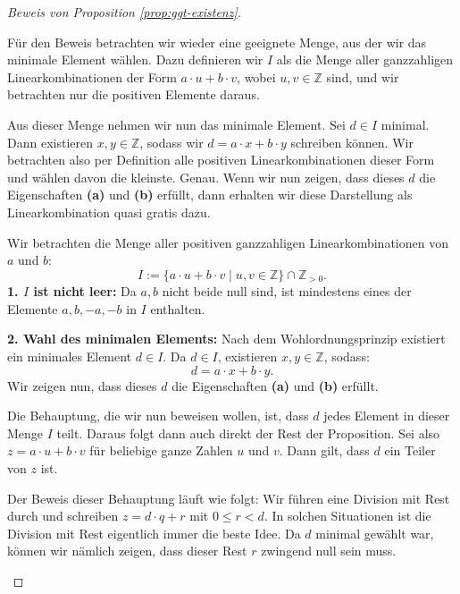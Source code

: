\begin{proof}[Beweis von Proposition \ref{prop:ggt-existenz}]
\begin{spoken-clean}[00:17:50 - 00:20:15]
Für den Beweis betrachten wir wieder eine geeignete Menge, aus der wir das minimale Element wählen. Dazu definieren wir $I$ als die Menge aller ganzzahligen Linearkombinationen der Form $a \cdot u + b \cdot v$, wobei $u, v \in \mathbb{Z}$ sind, und wir betrachten nur die positiven Elemente daraus.

Aus dieser Menge nehmen wir nun das minimale Element. Sei $d \in I$ minimal. Dann existieren $x, y \in \mathbb{Z}$, sodass wir $d = a \cdot x + b \cdot y$ schreiben können. Wir betrachten also per Definition alle positiven Linearkombinationen dieser Form und wählen davon die kleinste. Genau. Wenn wir nun zeigen, dass dieses $d$ die Eigenschaften \textbf{(a)} und \textbf{(b)} erfüllt, dann erhalten wir diese Darstellung als Linearkombination quasi gratis dazu.
\end{spoken-clean}

\begin{math-stroke}
\begin{short-proof}
Wir betrachten die Menge aller positiven ganzzahligen Linearkombinationen von $a$ und $b$:
\[
I := \{ a \cdot u + b \cdot v \mid u, v \in \mathbb{Z} \} \cap \mathbb{Z}_{>0}.
\]
\textbf{1. $I$ ist nicht leer:}
Da $a, b$ nicht beide null sind, ist mindestens eines der Elemente $a, b, -a, -b$ in $I$ enthalten.

\textbf{2. Wahl des minimalen Elements:}
Nach dem Wohlordnungsprinzip existiert ein minimales Element $d \in I$. Da $d \in I$, existieren $x, y \in \mathbb{Z}$, sodass:
\[
d = a \cdot x + b \cdot y.
\]
Wir zeigen nun, dass dieses $d$ die Eigenschaften \textbf{(a)} und \textbf{(b)} erfüllt.
\end{short-proof}
\end{math-stroke}

\begin{spoken-clean}[00:20:15 - 00:22:45]
Die Behauptung, die wir nun beweisen wollen, ist, dass $d$ jedes Element in dieser Menge $I$ teilt. Daraus folgt dann auch direkt der Rest der Proposition. Sei also $z = a \cdot u + b \cdot v$ für beliebige ganze Zahlen $u$ und $v$. Dann gilt, dass $d$ ein Teiler von $z$ ist.

Der Beweis dieser Behauptung läuft wie folgt: Wir führen eine Division mit Rest durch und schreiben $z = d \cdot q + r$ mit $0 \le r < d$. In solchen Situationen ist die Division mit Rest eigentlich immer die beste Idee. Da $d$ minimal gewählt war, können wir nämlich zeigen, dass dieser Rest $r$ zwingend null sein muss.


\end{spoken-clean}
\end{proof}

